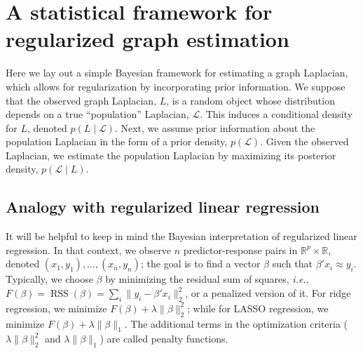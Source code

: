 \documentclass[12pt]{article}
\newcommand{\reals}{\mathbb{R}}
\DeclareMathOperator*{\RSS}{RSS}
\theoremstyle{plain}
\begin{document}


\section{A statistical framework for regularized graph estimation}
\label{snx:framework}

Here we lay out a simple Bayesian framework for estimating a graph
Laplacian, which allows for regularization by incorporating prior
information.  We suppose that the observed graph Laplacian, $L$, is a
random object whose distribution depends on a true ``population''
Laplacian, $\mathcal{L}$.  This induces a conditional density for $L$,
denoted $p(L \mid \mathcal{L})$.  Next, we assume prior information
about the population Laplacian in the form of a prior density,
$p(\mathcal{L})$.  Given the observed Laplacian, we estimate the
population Laplacian by maximizing its posterior density,
$p(\mathcal{L} \mid L)$.


\subsection{Analogy with regularized linear regression}
\label{S:regression}

It will be helpful to keep in mind the Bayesian interpretation of 
regularized linear regression.  
In that context, we observe $n$ predictor-response pairs in 
$\reals^p \times \reals$, denoted $(x_1, y_1), \dotsc, (x_n, y_n)$; 
the goal is to find a vector $\beta$ such that $\beta' x_i \approx y_i$.  
Typically, we choose $\beta$ by minimizing the residual sum of squares,
\emph{i.e.}, $F(\beta)=\RSS(\beta) = \sum_i \| y_i - \beta' x_i \|_2^2$, or 
a penalized version of it.  
For ridge regression, we minimize $F(\beta) + \lambda \|\beta\|_2^2$; while 
for LASSO regression, we minimize $F(\beta) + \lambda \|\beta\|_1$.  
The additional terms in the optimization criteria ($\lambda \|\beta\|_2^2$ 
and $\lambda \|\beta\|_1$) are called penalty functions.
\end{document}
